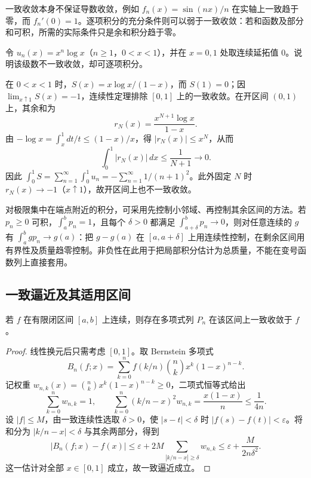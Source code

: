 一致收敛本身不保证导数收敛，例如 $f_n(x)=\sin(nx)/n$ 在实轴上一致趋于零，而 $f_n'(0)=1$。逐项积分的充分条件则可以弱于一致收敛：若和函数及部分和可积，所需的实际条件只是余和积分趋于零。

\begin{example}
\label{ex:pei-nonuniform-integration}
令 $u_n(x)=x^n\log x$（$n\geq1$，$0<x<1$），并在 $x=0,1$ 处取连续延拓值 $0$。说明该级数不一致收敛，却可逐项积分。
\end{example}
\begin{solve}
在 $0<x<1$ 时，$S(x)=x\log x/(1-x)$，而 $S(1)=0$；因 $\lim_{x\uparrow1}S(x)=-1$，连续性定理排除 $[0,1]$ 上的一致收敛。在开区间 $(0,1)$ 上，其余和为
\[
 r_N(x)=\frac{x^{N+1}\log x}{1-x}.
\]
由 $-\log x=\int_x^1dt/t\leq(1-x)/x$，得 $|r_N(x)|\leq x^N$，从而
\[
 \int_0^1|r_N(x)|\,dx\leq\frac1{N+1}\longrightarrow0.
\]
因此 $\int_0^1S=\sum_{n=1}^{\infty}\int_0^1u_n=-\sum_{n=1}^{\infty}1/(n+1)^2$。此外固定 $N$ 时 $r_N(x)\to-1$（$x\uparrow1$），故开区间上也不一致收敛。
\end{solve}

对极限集中在端点附近的积分，可采用先控制小邻域、再控制其余区间的方法。若 $p_n\geq0$ 可积，$\int_a^bp_n=1$，且每个 $\delta>0$ 都满足 $\int_{a+\delta}^{b}p_n\to0$，则对任意连续的 $g$ 有 $\int_a^bgp_n\to g(a)$：把 $g-g(a)$ 在 $[a,a+\delta]$ 上用连续性控制，在剩余区间用有界性及质量趋零控制。非负性在此用于把局部积分估计为总质量，不能在变号函数列上直接套用。

\subsection{一致逼近及其适用区间}

\begin{theorem}
\label{thm:pei-weierstrass-approximation}
若 $f$ 在有限闭区间 $[a,b]$ 上连续，则存在多项式列 $P_n$ 在该区间上一致收敛于 $f$。
\end{theorem}
\begin{proof}
线性换元后只需考虑 $[0,1]$。取 Bernstein 多项式
\[
 B_n(f;x)=\sum_{k=0}^{n}f(k/n)\binom nkx^k(1-x)^{n-k}.
\]
记权重 $w_{n,k}(x)=\binom nkx^k(1-x)^{n-k}\geq0$，二项式恒等式给出
\[
 \sum_{k=0}^{n}w_{n,k}=1,\qquad
 \sum_{k=0}^{n}(k/n-x)^2w_{n,k}=\frac{x(1-x)}n\leq\frac1{4n}.
\]
设 $|f|\leq M$，由一致连续性选取 $\delta>0$，使 $|s-t|<\delta$ 时 $|f(s)-f(t)|<\varepsilon$。将和分为 $|k/n-x|<\delta$ 与其余两部分，得到
\[
 |B_n(f;x)-f(x)|
 \leq\varepsilon+2M\sum_{|k/n-x|\geq\delta}w_{n,k}
 \leq\varepsilon+\frac{M}{2n\delta^2}.
\]
这一估计对全部 $x\in[0,1]$ 成立，故一致逼近成立。
\end{proof}

